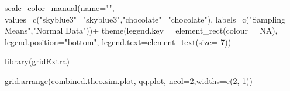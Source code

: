 \documentclass[]{article}
\newenvironment{Shaded}{}{}
\newcommand{\KeywordTok}[1]{\textcolor[rgb]{0.00,0.00,1.00}{{#1}}}
\newcommand{\DataTypeTok}[1]{{#1}}
\newcommand{\DecValTok}[1]{{#1}}
\newcommand{\StringTok}[1]{\textcolor[rgb]{0.00,0.50,0.50}{{#1}}}
\newcommand{\OtherTok}[1]{\textcolor[rgb]{1.00,0.25,0.00}{{#1}}}
\newcommand{\NormalTok}[1]{{#1}}
\begin{document}
\begin{Shaded}
\begin{Highlighting}[]
\StringTok{        }\KeywordTok{scale_color_manual}\NormalTok{(}\DataTypeTok{name=}\StringTok{""}\NormalTok{, }
                           \DataTypeTok{values=}\KeywordTok{c}\NormalTok{(}\StringTok{"skyblue3"}\NormalTok{=}\StringTok{"skyblue3"}\NormalTok{,}\StringTok{"chocolate"}\NormalTok{=}\StringTok{"chocolate"}\NormalTok{), }
                           \DataTypeTok{labels=}\KeywordTok{c}\NormalTok{(}\StringTok{"Sampling Means"}\NormalTok{,}\StringTok{"Normal Data"}\NormalTok{))+}
\StringTok{        }\KeywordTok{theme}\NormalTok{(}\DataTypeTok{legend.key =} \KeywordTok{element_rect}\NormalTok{(}\DataTypeTok{colour =} \OtherTok{NA}\NormalTok{), }\DataTypeTok{legend.position=}\StringTok{"bottom"}\NormalTok{,}
              \DataTypeTok{legend.text=}\KeywordTok{element_text}\NormalTok{(}\DataTypeTok{size=} \DecValTok{7}\NormalTok{))}

\KeywordTok{library}\NormalTok{(gridExtra)}

\KeywordTok{grid.arrange}\NormalTok{(combined.theo.sim.plot, qq.plot, }\DataTypeTok{ncol=}\DecValTok{2}\NormalTok{,}\DataTypeTok{widths=}\KeywordTok{c}\NormalTok{(}\DecValTok{2}\NormalTok{, }\DecValTok{1}\NormalTok{))}
\end{Highlighting}
\end{Shaded}

\end{document}
